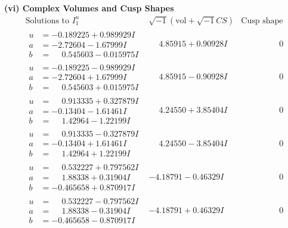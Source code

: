 \documentclass[1p]{elsarticle_modified}
\theoremstyle{definition}
\newcommand{\I}{\sqrt{-1}}
\begin{document}
\newpage\flushleft \textbf{(vi) Complex Volumes and Cusp Shapes}
$$\begin{array}{c|c|c}  
\text{Solutions to }I^u_{1}& \I (\text{vol} + \sqrt{-1}CS) & \text{Cusp shape}\\
 \hline 
\begin{aligned}
u &= -0.189225 + 0.989929 I \\
a &= -2.72604 - 1.67999 I \\
b &= \phantom{-}0.545603 - 0.015975 I\end{aligned}
 & \phantom{-}4.85915 + 0.90928 I & \phantom{-0.000000 } 0 \\ \hline\begin{aligned}
u &= -0.189225 - 0.989929 I \\
a &= -2.72604 + 1.67999 I \\
b &= \phantom{-}0.545603 + 0.015975 I\end{aligned}
 & \phantom{-}4.85915 - 0.90928 I & \phantom{-0.000000 } 0 \\ \hline\begin{aligned}
u &= \phantom{-}0.913335 + 0.327879 I \\
a &= -0.13404 - 1.61461 I \\
b &= \phantom{-}1.42964 - 1.22199 I\end{aligned}
 & \phantom{-}4.24550 + 3.85404 I & \phantom{-0.000000 } 0 \\ \hline\begin{aligned}
u &= \phantom{-}0.913335 - 0.327879 I \\
a &= -0.13404 + 1.61461 I \\
b &= \phantom{-}1.42964 + 1.22199 I\end{aligned}
 & \phantom{-}4.24550 - 3.85404 I & \phantom{-0.000000 } 0 \\ \hline\begin{aligned}
u &= \phantom{-}0.532227 + 0.797562 I \\
a &= \phantom{-}1.88338 + 0.31904 I \\
b &= -0.465658 + 0.870917 I\end{aligned}
 & -4.18791 - 0.46329 I & \phantom{-0.000000 } 0 \\ \hline\begin{aligned}
u &= \phantom{-}0.532227 - 0.797562 I \\
a &= \phantom{-}1.88338 - 0.31904 I \\
b &= -0.465658 - 0.870917 I\end{aligned}
 & -4.18791 + 0.46329 I & \phantom{-0.000000 } 0 \\ \hline\begin{aligned}

\end{aligned}
\end{array}$$
\end{document}
